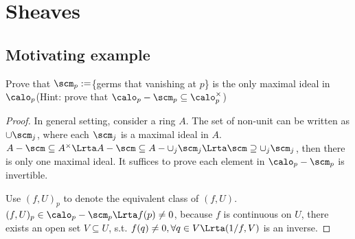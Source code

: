\chapter{Sheaves}
\section{Motivating example}
\begin{exr}
Prove that $\scm_p:=$\{germs that vanishing at $p$\} is the only maximal ideal in $\calo_p$(Hint: prove that $\calo_p-\scm_p\subseteq \calo_p^{\times}$)
\end{exr}
\begin{proof}In general setting, consider a ring $A$.
The set of non-unit can be written as $\cup\scm_j$, where each $\scm_j$ is a maximal ideal in $A$. $A-\scm\subseteq A^\times\Lrta A-\scm\subseteq A-\cup_j\scm_j\Lrta \scm\supseteq\cup_j\scm_j$, then there is only one maximal ideal. It suffices to prove each element in $\calo_p-\scm_p$ is invertible. 

Use $(f,U)_p$ to denote the equivalent class of $(f,U)$.
$(f,U)_p\in \calo_p-\scm_p\Lrta f(p)\neq 0$, because $f$ is continuous on $U$, there exists an open set $V\subseteq U$, s.t. $f(q)\neq0,\forall q\in V\Lrta (1/f,V)$ is an inverse.
\end{proof}

